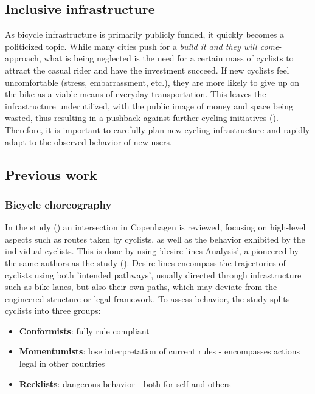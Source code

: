 \subsection{Inclusive infrastructure}
As bicycle infrastructure is primarily publicly funded, it quickly becomes a politicized topic. 
While many cities push for a \textit{build it and they will come}-approach, what is being neglected
is the need for a certain mass of cyclists to attract the casual rider and have the investment succeed.
If new cyclists feel uncomfortable (stress, embarrassment, etc.), they are more likely to give up on the bike as a viable means of everyday transportation. 
This leaves the infrastructure underutilized, with the public image of money and space being wasted, 
thus resulting in a pushback against further cycling initiatives (\cite{backlash}).
Therefore, it is important to carefully plan new cycling infrastructure and rapidly adapt to the observed behavior of new users.

\subsection{Previous work}

\subsubsection{Bicycle choreography}
In the study (\cite{copenhagenize2014}) an intersection in Copenhagen is reviewed, focusing on high-level aspects
such as routes taken by cyclists, as well as the behavior exhibited by the individual cyclists.
This is done by using 'desire lines Analysis', a  pioneered by the same authors as the study (\cite{copenhagenize_book}).
Desire lines encompass the trajectories of cyclists using both 'intended pathways', usually directed through infrastructure such as
 bike lanes, but also their own paths, which may deviate from the engineered structure or legal framework.
 To assess behavior, the study splits cyclists into three groups:

\begin{itemize}
	\item \textbf{Conformists}: fully rule compliant
	\item \textbf{Momentumists}: lose interpretation of current rules - encompasses actions legal in other countries
	\item \textbf{Recklists}: dangerous behavior - both for self and others
\end{itemize}

